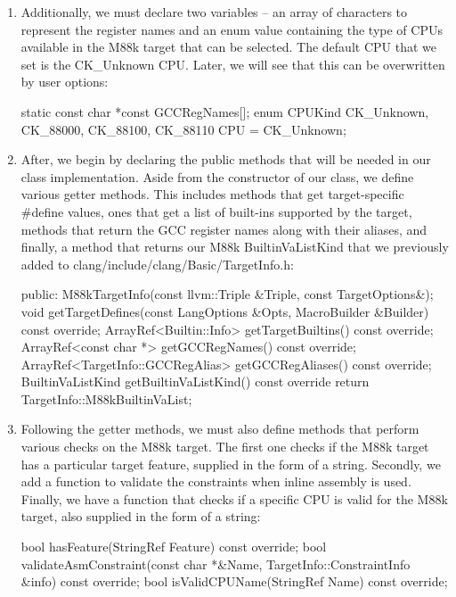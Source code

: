 \begin{enumerate}
\begin{cpp}
class LLVM_LIBRARY_VISIBILITY M88kTargetInfo: public TargetInfo
{
\end{cpp}

\item
Additionally, we must declare two variables – an array of characters to represent the register names and an enum value containing the type of CPUs available in the M88k target that can be selected. The default CPU that we set is the CK\_Unknown CPU. Later, we will see that this can be overwritten by user options:

\begin{cpp}
    static const char *const GCCRegNames[];
    enum CPUKind { CK_Unknown, CK_88000, CK_88100, CK_88110 } CPU = CK_Unknown;
\end{cpp}

\item
After, we begin by declaring the public methods that will be needed in our class implementation. Aside from the constructor of our class, we define various getter methods. This includes methods that get target-specific \#define values, ones that get a list of built-ins supported by the target, methods that return the GCC register names along with their aliases, and finally, a method that returns our M88k BuiltinVaListKind that we previously added to clang/include/clang/Basic/TargetInfo.h:

\begin{cpp}
public:
    M88kTargetInfo(const llvm::Triple &Triple, const TargetOptions&);
    void getTargetDefines(const LangOptions &Opts,
    MacroBuilder &Builder) const override;
    ArrayRef<Builtin::Info> getTargetBuiltins() const override;
    ArrayRef<const char *> getGCCRegNames() const override;
    ArrayRef<TargetInfo::GCCRegAlias> getGCCRegAliases() const override;
    BuiltinVaListKind getBuiltinVaListKind() const override {
        return TargetInfo::M88kBuiltinVaList;
    }
\end{cpp}

\item
Following the getter methods, we must also define methods that perform various checks on the M88k target. The first one checks if the M88k target has a particular target feature, supplied in the form of a string. Secondly, we add a function to validate the constraints when inline assembly is used. Finally, we have a function that checks if a specific CPU is valid for the M88k target, also supplied in the form of a string:

\begin{cpp}
    bool hasFeature(StringRef Feature) const override;
    bool validateAsmConstraint(const char *&Name,
                                TargetInfo::ConstraintInfo &info)
                                const override;
    bool isValidCPUName(StringRef Name) const override;
\end{cpp}


\end{enumerate}

